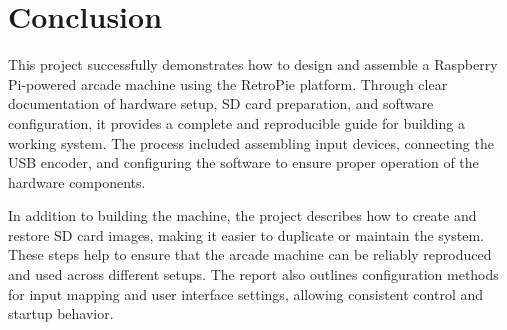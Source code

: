 {
\setlength{\parskip}{1em}

\chapter{Conclusion}
\label{cha:conclusion}

This project successfully demonstrates how to design and assemble a Raspberry Pi-powered arcade machine using the RetroPie platform. Through clear documentation of hardware setup, SD card preparation, and software configuration, it provides a complete and reproducible guide for building a working system. The process included assembling input devices, connecting the USB encoder, and configuring the software to ensure proper operation of the hardware components.

In addition to building the machine, the project describes how to create and restore SD card images, making it easier to duplicate or maintain the system. These steps help to ensure that the arcade machine can be reliably reproduced and used across different setups. The report also outlines configuration methods for input mapping and user interface settings, allowing consistent control and startup behavior.
}